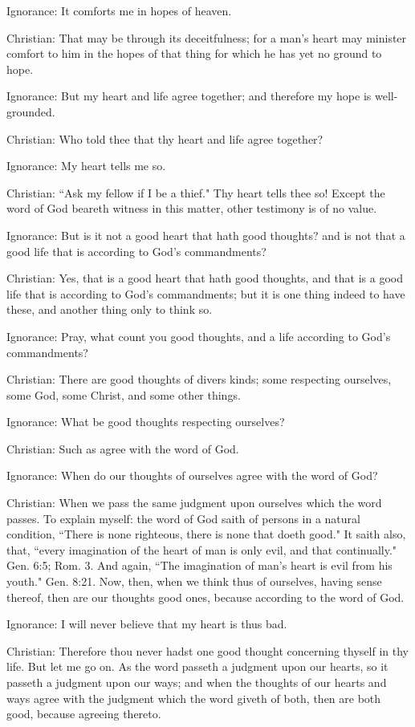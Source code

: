 Ignorance: It comforts me in hopes of heaven.

Christian: That may be through its deceitfulness; for a man's heart may minister comfort to him in the hopes of that thing for which he has yet no ground to hope.

Ignorance: But my heart and life agree together; and therefore my hope is well-grounded.

Christian: Who told thee that thy heart and life agree together?

Ignorance: My heart tells me so.

Christian: ``Ask my fellow if I be a thief." Thy heart tells thee so! Except the word of God beareth witness in this matter, other testimony is of no value.

Ignorance: But is it not a good heart that hath good thoughts? and is not that a good life that is according to God's commandments?

Christian: Yes, that is a good heart that hath good thoughts, and that is a good life that is according to God's commandments; but it is one thing indeed to have these, and another thing only to think so.

Ignorance: Pray, what count you good thoughts, and a life according to God's commandments?

Christian: There are good thoughts of divers kinds; some respecting ourselves, some God, some Christ, and some other things.

Ignorance: What be good thoughts respecting ourselves?

Christian: Such as agree with the word of God.

Ignorance: When do our thoughts of ourselves agree with the word of God?

Christian: When we pass the same judgment upon ourselves which the word passes. To explain myself: the word of God saith of persons in a natural condition, ``There is none righteous, there is none that doeth good." It saith also, that, ``every imagination of the heart of man is only evil, and that continually." Gen. 6:5; Rom. 3. And again, ``The imagination of man's heart is evil from his youth." Gen. 8:21. Now, then, when we think thus of ourselves, having sense thereof, then are our thoughts good ones, because according to the word of God.

Ignorance: I will never believe that my heart is thus bad.

Christian: Therefore thou never hadst one good thought concerning thyself in thy life. But let me go on. As the word passeth a judgment upon our hearts, so it passeth a judgment upon our ways; and when the thoughts of our hearts and ways agree with the judgment which the word giveth of both, then are both good, because agreeing thereto.

